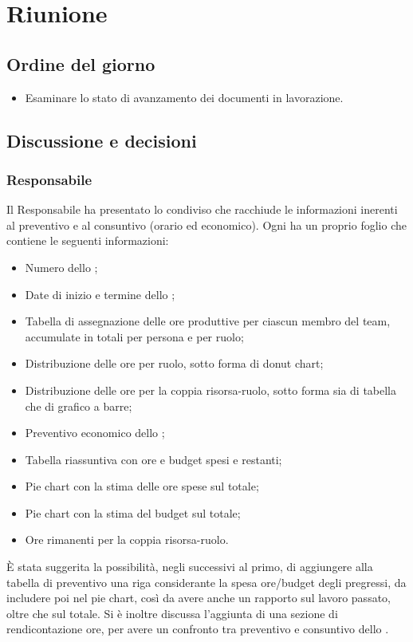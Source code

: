 \section{Riunione}
\subsection{Ordine del giorno}
\begin{itemize}
	\item Esaminare lo stato di avanzamento dei documenti in lavorazione.
\end{itemize}

\subsection{Discussione e decisioni}

\subsubsection{Responsabile}
Il Responsabile ha presentato lo  condiviso che racchiude le informazioni inerenti al preventivo e al consuntivo (orario ed economico). Ogni  ha un proprio foglio che contiene le seguenti informazioni:
\begin{itemize}
	\item Numero dello ;
	\item Date di inizio e termine dello ;
	\item Tabella di assegnazione delle ore produttive per ciascun membro del team, accumulate in totali per persona e per ruolo;
	\item Distribuzione delle ore per ruolo, sotto forma di donut chart;
	\item Distribuzione delle ore per la coppia risorsa-ruolo, sotto forma sia di tabella che di grafico a barre;
	\item Preventivo economico dello ;
	\item Tabella riassuntiva con ore e budget spesi e restanti;
	\item Pie chart con la stima delle ore spese sul totale;
	\item Pie chart con la stima del budget sul totale;
	\item Ore rimanenti per la coppia risorsa-ruolo.
\end{itemize}

\vspace{0.5\baselineskip}
È stata suggerita la possibilità, negli  successivi al primo, di aggiungere alla tabella di preventivo una riga considerante la spesa ore/budget degli  pregressi, da includere poi nel pie chart, così da avere anche un rapporto sul lavoro passato, oltre che sul totale. Si è inoltre discussa l'aggiunta di una sezione di rendicontazione ore, per avere un confronto tra preventivo e consuntivo dello .

